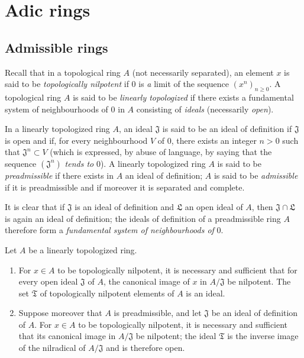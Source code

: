 \section{Adic rings}
\label{section:0.7}

\subsection{Admissible rings}
\label{subsection:0.7.1}

\begin{env}[7.1.1]
\label{0.7.1.1}
Recall that in a topological ring $A$ (not necessarily separated), an
element $x$ is said to be \emph{topologically nilpotent} if $0$ is \emph{a} limit of
the sequence $(x^n)_{n\geq0}$. A topological ring $A$ is said to be
\emph{linearly topologized} if there exists a fundamental system of neighbourhoods of
$0$ in $A$ consisting of \emph{ideals} (necessarily \emph{open}).
\end{env}

\begin{definition}[7.1.2]
\label{0.7.1.2}
In a linearly topologized ring $A$, an ideal $\mathfrak J$ is said to be
an \textup{ideal of definition} if $\mathfrak J$ is open and if, for every
neighbourhood $V$ of $0$, there exists an integer $n>0$ such
that $\mathfrak J^n\subset V$ \textup{(which is expressed, by abuse of language, by saying
that the sequence $(\mathfrak J^n)$ \emph{tends to} $0$)}. A linearly
topologized ring $A$ is said to be \emph{preadmissible} if there exists in $A$ an ideal of definition;
$A$ is said to be \emph{admissible} if it is preadmissible and if moreover it is
separated and complete.
\end{definition}

It is clear that if $\mathfrak J$ is an ideal of definition and $\mathfrak L$ an
open ideal of $A$, then $\mathfrak J\cap\mathfrak L$ is again an ideal of
definition; the ideals of definition of a preadmissible ring $A$ therefore form
a \emph{fundamental system of neighbourhoods of} $0$.

\begin{lemma}[7.1.3]
\label{0.7.1.3}
Let $A$ be a linearly topologized ring.
\begin{enumerate}
  \item[{\upshape(i)}] For $x\in A$ to be topologically nilpotent, it is
    necessary and sufficient that for every open ideal $\mathfrak J$ of $A$, the canonical
    image of $x$ in $A/\mathfrak J$ be nilpotent. The set
    $\mathfrak T$ of topologically nilpotent elements of $A$ is an ideal.
  \item[{\upshape(ii)}] Suppose moreover that $A$ is preadmissible, and let
    $\mathfrak J$ be an ideal of definition of $A$. For $x\in A$ to be
    topologically nilpotent, it is necessary and sufficient that its canonical image in
    $A/\mathfrak J$ be nilpotent; the ideal $\mathfrak T$ is the inverse
    image of the nilradical of $A/\mathfrak J$ and is therefore open.
\end{enumerate}
\end{lemma}

